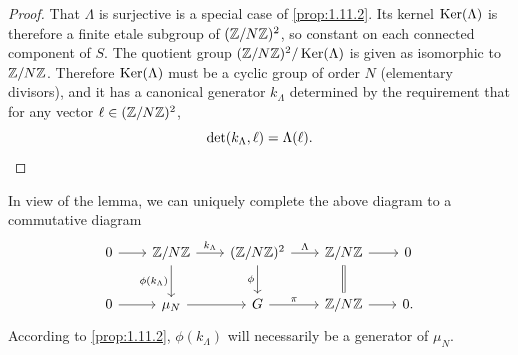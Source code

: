 \begin{proof}
That $\Lambda$ is surjective is a special case of \eqref{prop:1.11.2}. Its kernel $\operatorname{Ker}(\Lambda)$ is therefore a finite etale subgroup of $(\mathbb{Z}/N\mathbb{Z})^2$, so constant on each connected component of $S$. The quotient group $(\mathbb{Z}/N\mathbb{Z})^2/\operatorname{Ker}(\Lambda)$ is given as isomorphic to $\mathbb{Z}/N\mathbb{Z}$. Therefore $\operatorname{Ker}(\Lambda)$ must be a cyclic group of order $N$ (elementary divisors), and it has a canonical generator $k_\Lambda$ determined by the requirement that for any vector $\ell \in (\mathbb{Z}/N\mathbb{Z})^2$,
\[
\det(k_\Lambda, \ell) = \Lambda(\ell) . \qedhere
\]
\end{proof}

\kmitem\label{item:10.2.3}
In view of the lemma, we can uniquely complete the above diagram to a commutative diagram
\begin{equation}\label{eq:10.2.3.1}
\begin{tikzcd}[row sep=2em, column sep=2em]
0 \arrow[r] & \Z/N\Z \arrow[r, "k_\Lambda"] \arrow[d, "\phi(k_\Lambda)"'] & (\Z/N\Z)^2 \arrow[r, "\Lambda"] \arrow[d, "\phi"'] & \Z/N\Z \arrow[r] \arrow[d, equal] & 0 \\
0 \arrow[r] & \mu_N \arrow[r] & G \arrow[r, "\pi"] & \Z/N\Z \arrow[r] & 0 .
\end{tikzcd}
\end{equation}
According to \eqref{prop:1.11.2}, $\phi(k_\Lambda)$ will necessarily be a generator of $\mu_N$.

